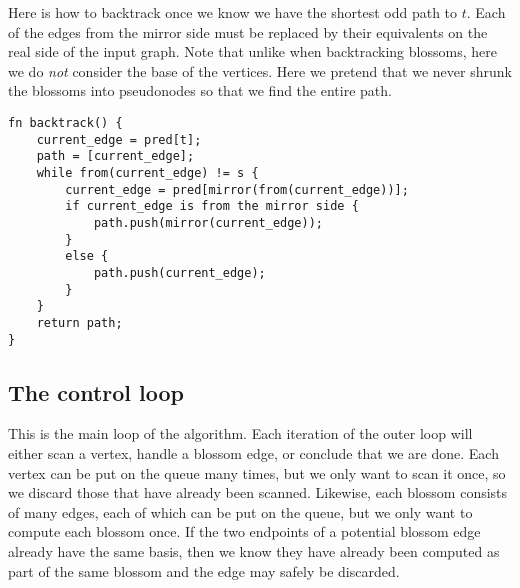 Here is how to backtrack once we know we have the shortest odd path to $t$. Each of the edges from the mirror side must be replaced by their equivalents on the real side of the input graph. Note that unlike when backtracking blossoms, here we do \emph{not} consider the base of the vertices. Here we pretend that we never shrunk the blossoms into pseudonodes so that we find the entire path.
\begin{lstlisting}[caption={Backtracking},label=Listing,mathescape=true]
fn backtrack() {
    current_edge = pred[t];
    path = [current_edge];
    while from(current_edge) != s {
        current_edge = pred[mirror(from(current_edge))];
        if current_edge is from the mirror side {
            path.push(mirror(current_edge));
        }
        else {
            path.push(current_edge);
        }
    }
    return path;
}
\end{lstlisting}

\subsection{The control loop}
This is the main loop of the algorithm. Each iteration of the outer loop will either scan a vertex, handle a blossom edge, or conclude that we are done. Each vertex can be put on the queue many times, but we only want to scan it once, so we discard those that have already been scanned. Likewise, each blossom consists of many edges, each of which can be put on the queue, but we only want to compute each blossom once. If the two endpoints of a potential blossom edge already have the same basis, then we know they have already been computed as part of the same blossom and the edge may safely be discarded.

